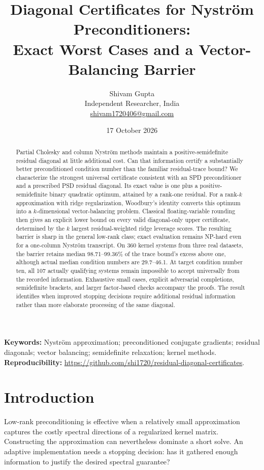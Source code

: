 \documentclass[11pt]{article}
\title{Diagonal Certificates for Nystr\"om Preconditioners:\\Exact Worst Cases and a Vector-Balancing Barrier}
\author{Shivam Gupta\\\small Independent Researcher, India\\\small\href{mailto:shivam1720406@gmail.com}{shivam1720406@gmail.com}}
\date{17 October 2026}
\theoremstyle{definition}\newtheorem{definition}[theorem]{Definition}
\begin{document}
\maketitle
\begin{abstract}
Partial Cholesky and column Nystr\"om methods maintain a positive-semidefinite residual diagonal at little additional cost. Can that information certify a substantially better preconditioned condition number than the familiar residual-trace bound? We characterize the strongest universal certificate consistent with an SPD preconditioner and a prescribed PSD residual diagonal. Its exact value is one plus a positive-semidefinite binary quadratic optimum, attained by a rank-one residual. For a rank-$k$ approximation with ridge regularization, Woodbury's identity converts this optimum into a $k$-dimensional vector-balancing problem. Classical floating-variable rounding then gives an explicit lower bound on every valid diagonal-only upper certificate, determined by the $k$ largest residual-weighted ridge leverage scores. The resulting barrier is sharp in the general low-rank class; exact evaluation remains NP-hard even for a one-column Nystr\"om transcript. On 360 kernel systems from three real datasets, the barrier retains median 98.71--99.36\% of the trace bound's excess above one, although actual median condition numbers are 29.7--46.1. At target condition number ten, all 107 actually qualifying systems remain impossible to accept universally from the recorded information. Exhaustive small cases, explicit adversarial completions, semidefinite brackets, and larger factor-based checks accompany the proofs. The result identifies when improved stopping decisions require additional residual information rather than more elaborate processing of the same diagonal.
\end{abstract}
\noindent\textbf{Keywords:} Nystr\"om approximation; preconditioned conjugate gradients; residual diagonals; vector balancing; semidefinite relaxation; kernel methods.\\
\textbf{Reproducibility:} \url{https://github.com/shi1720/residual-diagonal-certificates}.

\section{Introduction}
Low-rank preconditioning is effective when a relatively small approximation captures the costly spectral directions of a regularized kernel matrix. Constructing the approximation can nevertheless dominate a short solve. An adaptive implementation needs a stopping decision: has it gathered enough information to justify the desired spectral guarantee?
\end{document}
